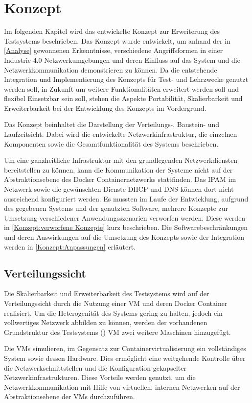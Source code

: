 \chapter{Konzept}
\label{Konzept}
Im folgenden Kapitel wird das entwickelte Konzept zur Erweiterung des Testsystems beschrieben. Das Konzept wurde entwickelt, um anhand der in \autoref{Analyse} gewonnenen Erkenntnisse, verschiedene Angriffsformen in einer Industrie 4.0 Netzwerkumgebungen und deren Einfluss auf das System und die Netzwerkkommunikation demonstrieren zu können. Da die entstehende Integration und Implementierung des Konzepts für Test- und Lehrzwecke genutzt werden soll, in Zukunft um weitere Funktionalitäten erweitert werden soll und flexibel Einsetzbar sein soll, stehen die Aspekte Portabilität, Skalierbarkeit und Erweiterbarkeit bei der Entwicklung des Konzepts im Vordergrund.

Das Konzept beinhaltet die Darstellung der Verteilungs-, Baustein- und Laufzeitsicht. Dabei wird die entwickelte Netzwerkinfrastruktur, die einzelnen Komponenten sowie die Gesamtfunktionalität des Systems beschrieben.

Um eine ganzheitliche Infrastruktur mit den grundlegenden Netzwerkdiensten bereitstellen zu können, kann die Kommunikation der Systeme nicht auf der Abstraktionsebene des Docker Containernetzwerks stattfinden. Das \ac{IPAM} im Netzwerk sowie die gewünschten Dienste \ac{DHCP} und \ac{DNS} können dort nicht ausreichend konfiguriert werden. Es mussten im Laufe der Entwicklung, aufgrund des gegebenen Systems und der genutzten Software, mehrere Konzepte zur Umsetzung verschiedener Anwendungsszenarien verworfen werden. Diese werden in \autoref{Konzept:verworfene Konzepte} kurz beschrieben. Die Softwarebeschränkungen und deren Auswirkungen auf die Umsetzung des Konzepts sowie der Integration werden in \autoref{Konzept:Anpassungen} erläutert.

\section{Verteilungssicht}
Die Skalierbarkeit und Erweiterbarkeit des Testsystems wird auf der Verteilungssicht durch die Nutzung einer \ac{VM} und deren Docker Container realisiert. Um die Heterogenität des Systems gering zu halten, jedoch ein vollwertiges Netzwerk abbilden zu können, werden der vorhandenen Grundstruktur des Testsystems (\cite{Weber2018}) \ac{VM} zwei weitere Maschinen hinzugefügt.

Die \ac{VM}s simulieren, im Gegensatz zur Containervirtualisierung ein vollständiges System sowie dessen Hardware. Dies ermöglicht eine weitgehende Kontrolle über die Netzwerkschnittstellen und die Konfiguration gekapselter Netzwerkinfrastrukturen. Diese Vorteile werden genutzt, um die Netzwerkkommunikation mit Hilfe von virtuellen, internen Netzwerken auf der Abstraktionsebene der \ac{VM}s durchzuführen.

